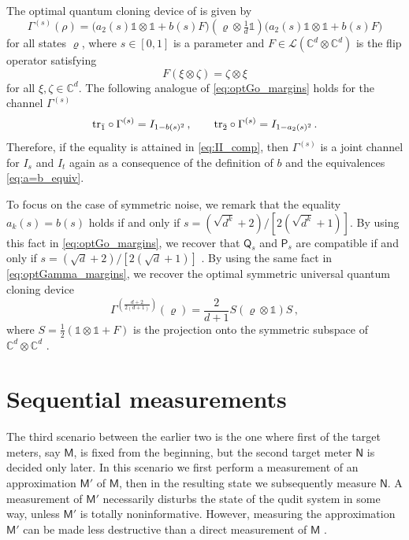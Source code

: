 \documentclass[12pt,reqno]{amsart}
\theoremstyle{definition}
\newcommand{\ptr}[2]{{\rm tr}_{#1} #2} %
\newcommand{\id}{\mathds{1}} %
\newcommand{\Mo}{\mathsf{M}}%
\newcommand{\Qo}{\mathsf{Q}}%
\newcommand{\Po}{\mathsf{P}}%
\newcommand{\No}{\mathsf{N}}%
\newcommand{\rhoo}{\varrho} %
\newcommand{\Cb}{\mathbb{C}} %
\newcommand{\elle}[1]{\mathcal{L}(#1)} %
\begin{document}
The optimal quantum cloning device of \cite[Eq.~(21)]{Hashagen17} is given by
\begin{equation}\label{eq:optGamma}
\Gamma^{(s)}(\rho) = \big(a_2(s)\id\otimes\id + b(s)F\big)\left(\rhoo\otimes\tfrac{1}{d}\id\right)\big(a_2(s)\id\otimes\id + b(s)F\big)
\end{equation}
for all states $\rhoo$, where $s\in [0,1]$ is a parameter and $F\in\elle{\Cb^d\otimes\Cb^d}$ is the flip operator satisfying
\begin{equation} %
F(\xi\otimes\zeta) = \zeta\otimes\xi
\end{equation}
for all $\xi,\zeta\in\Cb^d$. The following analogue of \eqref{eq:optGo_margins} holds for the channel $\Gamma^{(s)}$
\begin{equation}\label{eq:optGamma_margins}
\ptr{\bar{1}}{\circ\Gamma^{(s)}} = I_{1-b(s)^2}\,,\qquad \ptr{\bar{2}}{\circ\Gamma^{(s)}} = I_{1-a_2(s)^2}\,.
\end{equation}
Therefore, if the equality is attained in \eqref{eq:II_comp}, then $\Gamma^{(s)}$ is a joint channel for $I_s$ and $I_t$ again as a consequence of the definition of $b$ and the equivalences \eqref{eq:a=b_equiv}.

To focus on the case of symmetric noise, we remark that the equality $a_k(s) = b(s)$ holds if and only if $s=(\sqrt{d^k}+2)/[2(\sqrt{d^k}+1)]$. By using this fact in \eqref{eq:optGo_margins}, we recover that $\Qo_s$ and $\Po_s$ are compatible if and only if $s=(\sqrt{d}+2)/[2(\sqrt{d}+1)]$ \cite{DeSkFrBr19}. By using the same fact in \eqref{eq:optGamma_margins}, we recover the optimal symmetric universal quantum cloning device
\begin{equation*}
\Gamma^{\left(\frac{d+2}{2(d+1)}\right)}(\varrho) = \frac{2}{d+1} S (\varrho \otimes \id) S \,, 
\end{equation*}
where $S = \frac{1}{2}(\id\otimes\id + F)$ is the projection onto the symmetric subspace of $\Cb^d\otimes\Cb^d$ \cite{KeWe99}.


\section{Sequential measurements}\label{sec:sequential}

The third scenario between the earlier two is the one where first of the target meters, say $\Mo$, is fixed from the beginning, but the second target meter $\No$ is decided only later. 
In this scenario we first perform a measurement of an approximation $\Mo'$ of $\Mo$, then in the resulting state we subsequently measure $\No$. 
A measurement of $\Mo'$ necessarily disturbs the state of the qudit system in some way, unless $\Mo'$ is totally noninformative. 
However, measuring the approximation $\Mo'$ can be made less destructive than a direct measurement of $\Mo$ \cite{HeMi13}.
\end{document}
